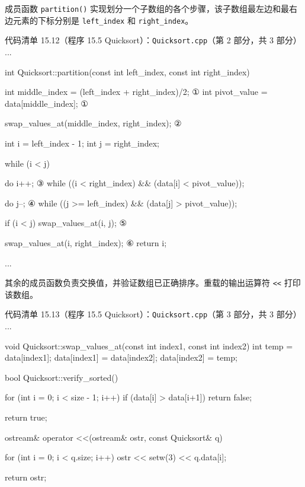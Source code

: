 成员函数 \texttt{partition(\allowbreak{})\allowbreak{}} 实现划分一个子数组的各个步骤，该子数组最左边和最右边元素的下标分别是 \texttt{left\_\allowbreak{}index} 和 \texttt{right\_\allowbreak{}index}。

\begin{codeboxt}{代码清单 15.12（程序 15.5 Quicksort）：\texttt{Quicksort.\allowbreak{}cpp}（第 2 部分，共 3 部分）}
...

int Quicksort::partition(const int left_index, const int right_index)
{
    int middle_index = (left_index + right_index)/2;             ①
    int pivot_value  = data[middle_index];                       ①

    swap_values_at(middle_index, right_index);                   ②

    int i = left_index - 1;
    int j = right_index;

    while (i < j)
    {
        do
        {
            i++;                                                 ③
        } while ((i < right_index) && (data[i] < pivot_value));

        do
        {
            j--;                                                 ④
        } while ((j >= left_index) && (data[j] > pivot_value));

        if (i < j) swap_values_at(i, j);                         ⑤
    }

    swap_values_at(i, right_index);                              ⑥
    return i;
}
...
\end{codeboxt}
\par
{}\par
{}\par
{}\par
{}\par
{}\par

其余的成员函数负责交换值，并验证数组已正确排序。重载的输出运算符 \texttt{<<} 打印该数组。

\begin{codeboxt}{代码清单 15.13（程序 15.5 Quicksort）：\texttt{Quicksort.\allowbreak{}cpp}（第 3 部分，共 3 部分）}
...

void Quicksort::swap_values_at(const int index1, const int index2)
{
    int temp = data[index1];
    data[index1] = data[index2];
    data[index2] = temp;
}

bool Quicksort::verify_sorted()
{
    for (int i = 0; i < size - 1; i++)
    {
        if (data[i] > data[i+1]) return false;
    }

    return true;
}

ostream& operator <<(ostream& ostr, const Quicksort& q)
{
    for (int i = 0; i < q.size; i++) ostr << setw(3) << q.data[i];

    return ostr;
}
\end{codeboxt}

